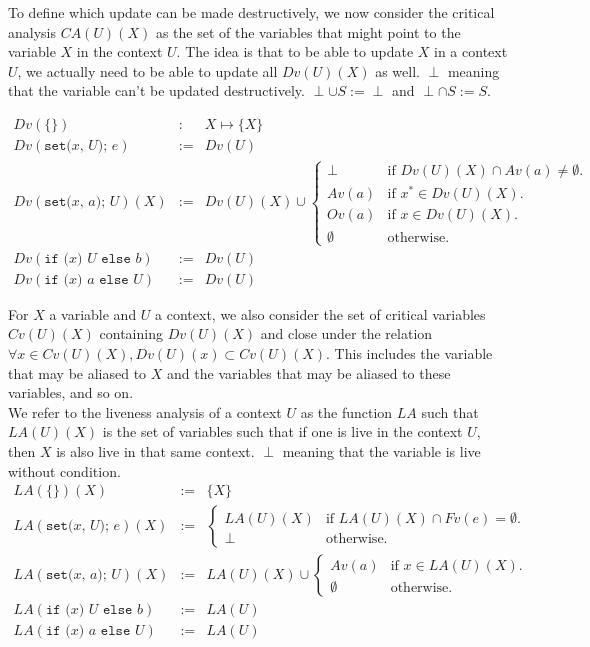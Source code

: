 \documentclass[12pt,a4paper]{article}
\newcommand{\cl}[1]{\texttt{#1}}
\newcommand{\ucont}[1]{\{#1\}}
\begin{document}
To define which update can be made destructively, we now consider the critical analysis $CA(U)(X)$ as the set of the variables that might point to the variable $X$ in the context $U$. The idea is that to be able to update $X$ in a context $U$, we actually need to be able to update all $Dv(U)(X)$ as well.
$\perp$ meaning that the variable can't be updated destructively. $\perp \cup S := \perp$ and $\perp \cap S := S$.

\begin{eqnarray*}
Dv(\ucont{} ) &:& X \mapsto \{ X \} \\
Dv( \cl{set(} x \cl{, } U \cl{); } e ) &:=& Dv(U) \\
Dv( \cl{set(} x \cl{, } a \cl{); } U )(X) &:=& Dv(U)(X) \cup \left\lbrace \begin{array}{ll}
\perp & \text{if $Dv(U)(X) \cap Av(a) \neq \emptyset$.} \\
Av(a) & \text{if $x^* \in Dv(U)(X)$.} \\
Ov(a) & \text{if $x \in Dv(U)(X)$.} \\
\emptyset & \text{otherwise.}
\end{array} \right. \\
Dv( \cl{if (} x \cl{) } U \cl{ else } b ) &:=& Dv(U) \\
Dv( \cl{if (} x \cl{) } a \cl{ else } U ) &:=& Dv(U) 
\end{eqnarray*}



For $X$ a variable and $U$ a context, we also consider the set of critical variables $Cv(U)(X)$ containing $Dv(U)(X)$ and close under the relation $\forall x \in Cv(U)(X), Dv(U)(x) \subset Cv(U)(X)$. This includes the variable that may be aliased to $X$ and the variables that may be aliased to these variables, and so on.\\

We refer to the liveness analysis of a context $U$ as the function $LA$ such that $LA(U)(X)$ is the set of variables such that if one is live in the context $U$, then $X$ is also live in that same context. $\perp$ meaning that the variable is live without condition.
\begin{eqnarray*}
LA(\ucont{} )(X) &:=& \{ X \} \\
LA( \cl{set(} x \cl{, } U \cl{); } e )(X) &:=& 
\left\lbrace \begin{array}{ll}
LA(U)(X) & \text{if $LA(U)(X) \cap Fv(e) = \emptyset$.} \\
\perp & \text{otherwise.}
\end{array} \right. \\
LA( \cl{set(} x \cl{, } a \cl{); } U )(X) &:=& LA(U)(X) \cup \left\lbrace \begin{array}{ll}
Av(a) & \text{if $x \in LA(U)(X)$.} \\
\emptyset & \text{otherwise.}
\end{array} \right. \\
LA( \cl{if (} x \cl{) } U \cl{ else } b ) &:=& LA(U) \\
LA( \cl{if (} x \cl{) } a \cl{ else } U ) &:=& LA(U)
\end{eqnarray*}
\end{document}
